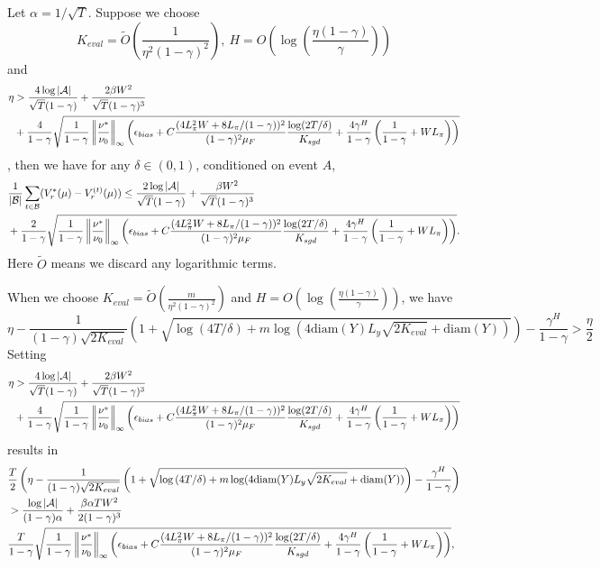 \begin{lemma}\label{Lemma_reward_bound}
    Let $\alpha=1/\sqrt{T}$. Suppose we choose
    $$K_{eval}=\widetilde{O}\left(\frac{1}{\eta^2(1-\gamma)^2}\right)
    ,~H=O\left(\log\left(\frac{\eta(1-\gamma)}{\gamma}\right)\right)$$ and
    $$\begin{aligned}
    \eta&> \frac{4\log |{\mathcal{A}}|}{\sqrt{T}(1-\gamma)}+\frac{2\beta W^2}{\sqrt{T}(1-\gamma)^3}\\
    &+\frac{4}{1-\gamma}\sqrt{\frac{1}{1-\gamma}\left\|\frac{\nu^*}{\nu_0}\right\|_\infty\left(\epsilon_{bias}+C\frac{(4L_\pi^2W+8L_\pi/(1-\gamma))^2}{(1-\gamma)^2\mu_F}\frac{\log(2T/\delta)}{K_{sgd}}+\frac{4\gamma^H}{1-\gamma}\left(\frac{1}{1-\gamma}+WL_\pi\right)\right)}
    \end{aligned}
    $$,
    then we have for any $\delta\in(0,1)$, conditioned on event $A$,
    $$
    \begin{aligned}
        &\frac{1}{|{\mathcal{B}}|}\sum_{t\in{\mathcal{B}}}(V_r^*(\mu)-V_r^{(t)}(\mu)) \leq \frac{2\log|{\mathcal{A}}|}{\sqrt{T}(1-\gamma)}+\frac{\beta W^2}{\sqrt{T}(1-\gamma)^3}\\
       &+\frac{2}{1-\gamma}\sqrt{\frac{1}{1-\gamma}\left\|\frac{\nu^*}{\nu_0}\right\|_\infty\left(\epsilon_{bias}+C\frac{(4L_\pi^2W+8L_\pi/(1-\gamma))^2}{(1-\gamma)^2\mu_F}\frac{\log(2T/\delta)}{K_{sgd}}+\frac{4\gamma^H}{1-\gamma}\left(\frac{1}{1-\gamma}+WL_\pi\right)\right)}.
    \end{aligned}
    $$
    Here $\widetilde{O}$ means we discard any logarithmic terms. 
\end{lemma}
    When we choose $K_{eval}=\widetilde{O}\left(\frac{m}{\eta^2(1-\gamma)^2}\right)$ and $H=O\left(\log\left(\frac{\eta(1-\gamma)}{\gamma}\right)\right)$, we have
    $$
    \eta-\frac{1}{(1-\gamma)\sqrt{2K_{eval}}}\left(1+\sqrt{\log{(4T/\delta)}+m\log(4\mathrm{diam}(Y)L_y\sqrt{2K_{eval}}+\mathrm{diam}(Y))}\right)-\frac{\gamma^H}{1-\gamma}
    >\frac{\eta}{2}$$
    Setting
    $$\begin{aligned}
    \eta&> \frac{4\log |{\mathcal{A}}|}{\sqrt{T}(1-\gamma)}+\frac{2\beta W^2}{\sqrt{T}(1-\gamma)^3}\\
    &+\frac{4}{1-\gamma}\sqrt{\frac{1}{1-\gamma}\left\|\frac{\nu^*}{\nu_0}\right\|_\infty\left(\epsilon_{bias}+C\frac{(4L_\pi^2W+8L_\pi/(1-\gamma))^2}{(1-\gamma)^2\mu_F}\frac{\log(2T/\delta)}{K_{sgd}}+\frac{4\gamma^H}{1-\gamma}\left(\frac{1}{1-\gamma}+WL_\pi\right)\right)}
    \end{aligned}
    $$
    results in
   $$\begin{aligned}
        &\frac{T}{2}\left(\eta-\frac{1}{(1-\gamma)\sqrt{2K_{eval}}}\left(1+\sqrt{\log{(4T/\delta)}+m\log(4\mathrm{diam}(Y)L_y\sqrt{2K_{eval}}+\mathrm{diam}(Y))}\right)-\frac{\gamma^H}{1-\gamma}\right)\\
        &>\frac{\log|{\mathcal{A}}|}{(1-\gamma)\alpha}+\frac{\beta\alpha TW^2}{2(1-\gamma)^3}\\
        &\frac{ T}{1-\gamma}\sqrt{\frac{1}{1-\gamma}\left\|\frac{\nu^*}{\nu_0}\right\|_\infty\left(\epsilon_{bias}+C\frac{(4L_\pi^2W+8L_\pi/(1-\gamma))^2}{(1-\gamma)^2\mu_F}\frac{\log(2T/\delta)}{K_{sgd}}+\frac{4\gamma^H}{1-\gamma}\left(\frac{1}{1-\gamma}+WL_\pi\right)\right)},
    \end{aligned}
    $$
